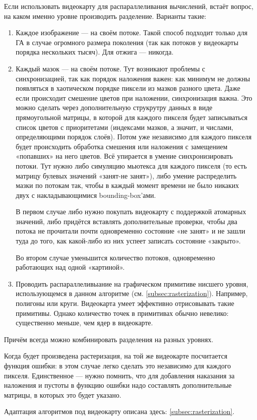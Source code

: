 Если использовать видеокарту для распараллеливания вычислений, встаёт вопрос, на каком именно уровне производить разделение.
Варианты такие:
\begin{enumerate}
    \item Каждое изображение — на своём потоке.
    Такой способ подходит только для ГА в случае огромного размера поколения (так как потоков у видеокарты порядка нескольких тысяч).
    Для отжига — никогда.

    \item Каждый мазок — на своём потоке.
                Тут возникают проблемы с синхронизацией, так как порядок наложения важен: как минимум не должны появляться в хаотическом порядке пиксели из мазков разного цвета.
                Даже если происходит смешение цветов при наложении, синхронизация важна.
                Это можно сделать через дополнительную струкрутру данных в виде прямоугольной матрицы, в которой для каждого пикселя будет записываться список цветов с приоритетами
                (индексами мазков, а значит, и числами, определяющими порядок слоёв).
                Потом уже независимо для каждого пикселя будет происходить обработка смешения или наложения с замещением «попавших» на него цветов.
                Всё упирается в умение синхронизировать потоки.
                Тут нужно либо симуляцию мьютекса для каждого пикселя (то есть матрицу булевых значений «занят-не занят»),
                либо умение распределить мазки по потокам так, чтобы в каждый момент времени не было никаких двух с накладывающимися bounding-box'ами.

                В первом случае либо нужно покупать видеокарту с поддержкой атомарных значений, либо придётся вставлять дополнительные проверки,
                чтобы два потока не прочитали почти одновременно состояние «не занят»  и не зашли туда до того, как какой-либо из них успеет записать состояние «закрыто».

                Во втором случае уменьшится количество потоков, одновременно работающих над одной «картиной».


    \item Проводить распараллеливыание на графическом примитиве нисшего уровня, использующемся в данном алгоритме (см. \ref{subsec:rasterization}).
                Например, полигоны или круги.
                Видеокарта умеет эффективно отрисовывать такие примитивы.
                Однако количество точек в примитивах обычно невелико: существенно меньше, чем ядер в видеокарте.
\end{enumerate}
Причём всегда можно комбинировать разделения на разных уровнях.

Когда будет произведена растеризация, на той же видеокарте посчитается функция ошибки: в этом случае легко сделать это независимо для каждого пикселя.
Единственное — нужно помнить, что для добавления наказания за наложения и пустоты в функцию ошибки надо составлять дополнительные матрицы, в которых это будет указано.


Адаптация алгоритмов под видеокарту описана здесь: \ref{subsec:rasterization}.